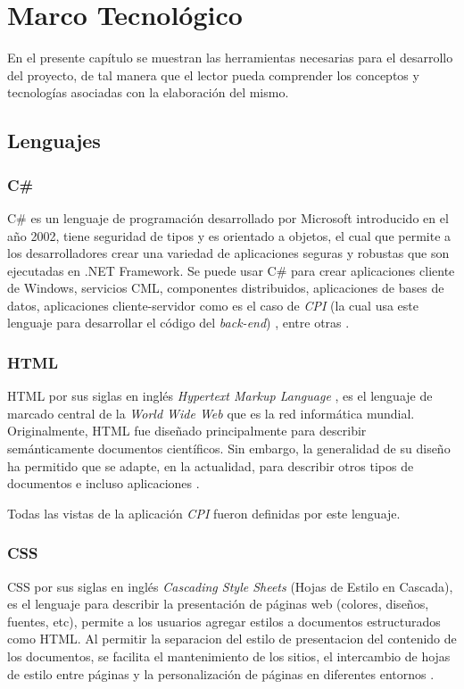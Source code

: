 \chapter{Marco Tecnológico}
En el presente capítulo se muestran las herramientas necesarias para el desarrollo del proyecto, de tal manera que el lector pueda comprender los conceptos y tecnologías asociadas con la elaboración del mismo. 

\section{Lenguajes}
\subsection{C\#}
C\# es un lenguaje de programación desarrollado por Microsoft introducido en el año 2002, tiene seguridad de tipos y es orientado a objetos, el cual que permite a los desarrolladores crear una variedad de aplicaciones seguras y robustas que son ejecutadas en .NET Framework. Se puede usar C\# para crear aplicaciones cliente de Windows, servicios CML, componentes distribuidos, aplicaciones de bases de datos, aplicaciones cliente-servidor como es el caso de \textit{CPI} (la cual usa este lenguaje para desarrollar el código del \textit{back-end}) , entre otras \cite{cSharpMicrosoft}.

\subsection{HTML}
HTML por sus siglas en inglés \textit{Hypertext Markup Language} , es el lenguaje de marcado central de la \textit{World Wide Web} que es la red informática mundial. Originalmente, HTML fue diseñado principalmente para describir semánticamente documentos científicos. Sin embargo, la generalidad de su diseño ha permitido que se adapte, en la actualidad, para describir otros tipos de documentos e incluso aplicaciones \cite{htmlW3C}.

Todas las vistas de la aplicación \textit{CPI} fueron definidas por este lenguaje.


\subsection{CSS}
CSS por sus siglas en inglés \textit{Cascading Style Sheets} (Hojas de Estilo en Cascada), es el lenguaje para describir la presentación de páginas web (colores, diseños, fuentes, etc), permite a los usuarios agregar estilos a documentos estructurados como HTML. Al permitir la separacion del estilo de presentacion del contenido de los documentos, se facilita el mantenimiento de los sitios, el intercambio de hojas de estilo entre páginas y la personalización  de páginas en diferentes entornos \cite{cssW3C}.

